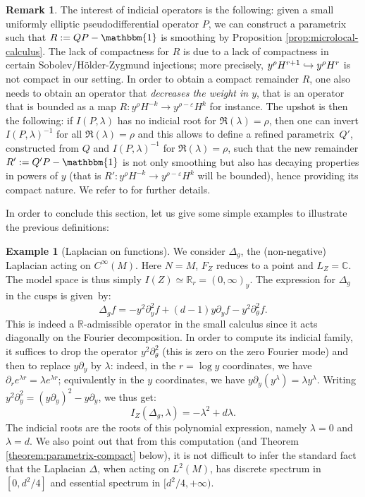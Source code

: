 \documentclass[10pt]{amsart}
\newcommand\hto{\mathrel{\lhook\joinrel\to}}
\newcommand{\C}{\mathbb{C}}
\newcommand{\R}{\mathbb{R}}
\newcommand{\eps}{\varepsilon}
\theoremstyle{plain}
\theoremstyle{definition}
\newtheorem{example}{Example}[section]
\newtheorem{remark}{Remark}[section]
\begin{document}
\begin{remark}\label{remark:why-indicial}
The interest of indicial operators is the following: given a small uniformly elliptic pseudodifferential operator $P$, we can construct a parametrix such that $R := QP-\mathbbm{1}$ is smoothing by Proposition \ref{prop:microlocal-calculus}. The lack of compactness for $R$ is due to a lack of compactness in certain Sobolev/Hölder-Zygmund injections; more precisely, $y^\rho H^{r+1} \hto y^\rho H^r$ is not compact in our setting. In order to obtain a compact remainder $R$, one also needs to obtain an operator that \emph{decreases the weight in $y$}, that is an operator that is bounded as a map $R : y^\rho H^{-k} \to y^{\rho-\eps}H^k$ for instance. The upshot is then the following: if $I(P,\lambda)$ has no indicial root for $\Re(\lambda) = \rho$, then one can invert $I(P,\lambda)^{-1}$ for all $\Re(\lambda)=\rho$ and this allows to define a refined parametrix~$Q'$, constructed from $Q$ and $I(P,\lambda)^{-1}$ for $\Re(\lambda)=\rho$, such that the new remainder $R':=Q'P-\mathbbm{1}$ is not only smoothing but also has decaying properties in powers of $y$ (that is $R' : y^\rho H^{-k} \to y^{\rho-\eps} H^k$ will be bounded), hence providing its compact nature. We refer to \cite[\S 4.2.3]{Bonthonneau-Lefeuvre-19-1} for further details.
\end{remark}

In order to conclude this section, let us give some simple examples to illustrate the previous definitions:

\begin{example}[Laplacian on functions]
We consider $\Delta_g$, the (non-negative) Laplacian acting on $C^\infty(M)$. Here $N=M$, $F_Z$ reduces to a point and $L_Z = \C$. The model space is thus simply $I(Z) \simeq \R_r = (0,\infty)_y$. The expression for $\Delta_g$ in the cusps is given~by:
\[
\Delta_g f = -y^2 \partial^2_y f + (d-1) y \partial_y f - y^2 \partial^2_\theta f.
\]
This is indeed a $\R$-admissible operator in the small calculus since it acts diagonally on the Fourier decomposition. In order to compute its indicial family, it suffices to drop the operator $y^2 \partial^2_\theta$ (this is zero on the zero Fourier mode) and then to replace $y \partial_y$ by $\lambda$: indeed, in the $r=\log y$ coordinates, we have $\partial_r e^{\lambda r} = \lambda e^{\lambda r}$; equivalently in the $y$ coordinates, we have $y \partial_y (y^\lambda) = \lambda y^\lambda$. Writing $y^2\partial_y^2 = (y\partial_y)^2-y\partial_y$, we thus get:
\[
I_Z(\Delta_g,\lambda) = -\lambda^2 + d\lambda.
\]
The indicial roots are the roots of this polynomial expression, namely $\lambda = 0$ and $\lambda=d$. We also point out that from this computation (and Theorem \ref{theorem:parametrix-compact} below), it is not difficult to infer the standard fact that the Laplacian $\Delta$, when acting on $L^2(M)$, has discrete spectrum in $[0,d^2/4]$ and essential spectrum in $[d^2/4,+\infty)$.
\end{example}
\end{document}
